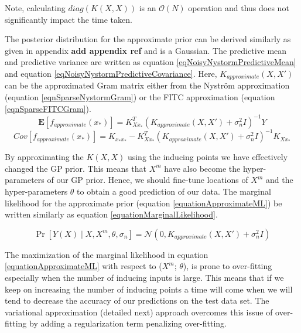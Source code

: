 Note, calculating \(diag(K(X, X))\) is an \(\mathcal{O}\left ( N \right )\) operation and thus does not significantly impact the time taken. 


The posterior distribution for the approximate prior can be derived similarly as given in appendix \textbf{add appendix ref} and is a Gaussian. The predictive mean and predictive variance are written as equation \ref{eqNoisyNystormPredictiveMean} and equation \ref{eqNoisyNystormPredictiveCovariance}. Here, \(K_{approximate}(X, X')\) can be the approximated Gram matrix either from the Nystr\"{o}m approximation (equation \ref{eqnSparseNystormGram}) or the FITC approximation (equation \ref{eqnSparseFITCGram}). 
\begin{equation}\label{eqNoisyNystormPredictiveMean}
  \mathbf{E}[f_{approximate}(x_{*})] = K_{Xx_{*}}^{T}( K_{approximate}(X, X') + \sigma^{2}_{n}I)^{-1}Y
  \end{equation}
\begin{equation}\label{eqNoisyNystormPredictiveCovariance}
	Cov[f_{approximate}(x_{*})] = K_{x_{*}x_{*}} - K_{Xx_{*}}^{T}( K_{approximate}(X, X') + \sigma^{2}_{n}I )^{-1} K_{Xx_{*}}
  \end{equation}


By approximating the \(K(X, X)\) using the inducing points we have effectively changed the GP prior. This means that \(X^{m}\) have also become the hyper-parameters of our GP prior. Hence, we should fine-tune locations of \(X^{m}\) and the hyper-parameters \(\theta\) to obtain a good prediction of our data. The marginal likelihood for the approximate prior (equation \ref{equationApproximateML}) be written similarly as equation \ref{equationMarginalLikelihood}.

\begin{equation}\label{equationApproximateML}
    \Pr[Y(X) \mid X, X^{m}, \theta, \sigma_{n}] = \mathcal{N}(0 , K_{approximate}(X, X') + \sigma^{2}_{n}I)
\end{equation}


The maximization of the marginal likelihood in equation \ref{equationApproximateML} with respect to (\(X^{m}\); \(\theta\)), is prone to over-fitting especially when the number of inducing inputs is large. This means that if we keep on increasing the number of inducing points a time will come when we will tend to decrease the accuracy of our predictions on the test data set. The variational approximation (detailed next) approach overcomes this issue of over-fitting by adding a regularization term penalizing over-fitting.

